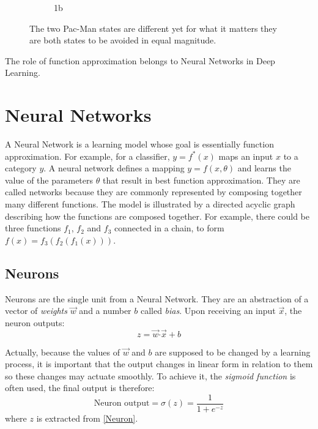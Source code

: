 \begin{figure}[h]
\begin{subfigure}{.5\textwidth}
		\caption{1b}
		\label{fig:sfig2}
	\end{subfigure}
	\caption{The two Pac-Man states  are different yet for what it matters they are both states to be avoided in equal magnitude.}
	\label{fig:Pacman}
\end{figure}

The role of function approximation belongs to Neural Networks in Deep Learning.

\section{Neural Networks}

A Neural Network is a learning model whose goal is essentially function approximation. For example, for a classifier, $y = f^*\left(x\right)$ maps an input $x$ to a category $y$. A neural network defines a mapping $y = f\left(x,\theta\right)$ and learns the value of the parameters $\theta$ that result in best function approximation.
They are called networks because they are commonly represented by composing together many different functions. The model is illustrated by a directed acyclic graph describing how the functions are composed together. For example, there could be three functions $f_{1}$, $f_{2}$ and $f_{3}$ connected in a chain, to form $f\left(x\right) = f_{3}\left(f_{2}\left(f_{1}\left(x\right)\right)\right)$.

\subsection{Neurons}

Neurons are the single unit from a Neural Network. They are an abstraction of a vector of \textit{weights} $\vec{w}$ and a number $b$ called \textit{bias}. Upon receiving an input $\vec{x}$, the neuron outputs:
\begin{equation}\label{Neuron}
z = \vec{w}\boldsymbol{\cdot}\vec{x} + b
\end{equation}

Actually, because the values of $\vec{w}$ and $b$ are supposed to be changed by a learning process, it is important that the output changes in linear form in relation to them so these changes may actuate smoothly. To achieve it, the \textit{sigmoid function} is often used, the final output is therefore:
\begin{equation}\label{}
\text{Neuron output} = \sigma\left(z\right) = \dfrac{1}{1 + e^{-z}}
\end{equation}
where $z$ is extracted from \ref{Neuron}.


